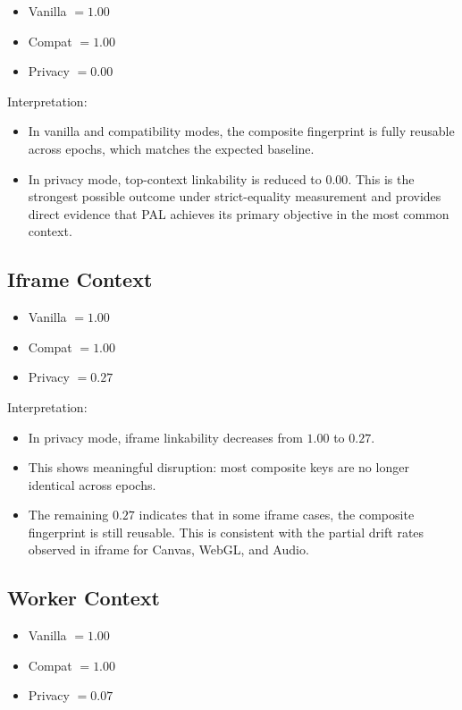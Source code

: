 \documentclass[11pt]{report}
\begin{document}
\begin{itemize}
    \item Vanilla $=1.00$
    \item Compat $=1.00$
    \item Privacy $=0.00$
\end{itemize}

Interpretation:
\begin{itemize}
    \item In vanilla and compatibility modes, the composite fingerprint is fully reusable across epochs, which matches the expected baseline.
    \item In privacy mode, top-context linkability is reduced to $0.00$. This is the strongest possible outcome under strict-equality measurement and provides direct evidence that PAL achieves its primary objective in the most common context.
\end{itemize}

\subsection{Iframe Context}

\begin{itemize}
    \item Vanilla $=1.00$
    \item Compat $=1.00$
    \item Privacy $=0.27$
\end{itemize}

Interpretation:
\begin{itemize}
    \item In privacy mode, iframe linkability decreases from $1.00$ to $0.27$.
    \item This shows meaningful disruption: most composite keys are no longer identical across epochs.
    \item The remaining $0.27$ indicates that in some iframe cases, the composite fingerprint is still reusable. This is consistent with the partial drift rates observed in iframe for Canvas, WebGL, and Audio.
\end{itemize}

\subsection{Worker Context}

\begin{itemize}
    \item Vanilla $=1.00$
    \item Compat $=1.00$
    \item Privacy $=0.07$
\end{itemize}
\end{document}
